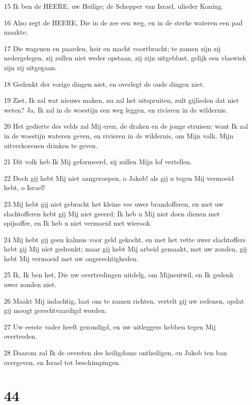 \par 15 Ik ben de HEERE, uw Heilige; de Schepper van Israel, ulieder Koning.
\par 16 Alzo zegt de HEERE, Die in de zee een weg, en in de sterke wateren een pad maakte;
\par 17 Die wagenen en paarden, heir en macht voortbracht; te zamen zijn zij nedergelegen, zij zullen niet weder opstaan, zij zijn uitgeblust, gelijk een vlaswiek zijn zij uitgegaan.
\par 18 Gedenkt der vorige dingen niet, en overlegt de oude dingen niet.
\par 19 Ziet, Ik zal wat nieuws maken, nu zal het uitspruiten, zult gijlieden dat niet weten? Ja, Ik zal in de woestijn een weg leggen, en rivieren in de wildernis.
\par 20 Het gedierte des velds zal Mij eren, de draken en de jonge struisen; want Ik zal in de woestijn wateren geven, en rivieren in de wildernis, om Mijn volk, Mijn uitverkorenen drinken te geven.
\par 21 Dit volk heb Ik Mij geformeerd, zij zullen Mijn lof vertellen.
\par 22 Doch gij hebt Mij niet aangeroepen, o Jakob! als gij u tegen Mij vermoeid hebt, o Israel!
\par 23 Mij hebt gij niet gebracht het kleine vee uwer brandofferen, en met uw slachtofferen hebt gij Mij niet geeerd; Ik heb u Mij niet doen dienen met spijsoffer, en Ik heb u niet vermoeid met wierook.
\par 24 Mij hebt gij geen kalmus voor geld gekocht, en met het vette uwer slachtoffers hebt gij Mij niet gedrenkt; maar gij hebt Mij arbeid gemaakt, met uw zonden, gij hebt Mij vermoeid met uw ongerechtigheden.
\par 25 Ik, Ik ben het, Die uw overtredingen uitdelg, om Mijnentwil, en Ik gedenk uwer zonden niet.
\par 26 Maakt Mij indachtig, laat ons te zamen richten, vertelt gij uw redenen, opdat gij moogt gerechtvaardigd worden.
\par 27 Uw eerste vader heeft gezondigd, en uw uitleggers hebben tegen Mij overtreden.
\par 28 Daarom zal Ik de oversten des heiligdoms ontheiligen, en Jakob ten ban overgeven, en Israel tot beschimpingen.

\chapter{44}

